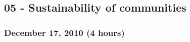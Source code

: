 \documentclass[a4paper]{article}
\begin{document}

    


\subsection{05 - Sustainability of communities}


\subsubsection{December 17, 2010 (4 hours)}
\end{document}
